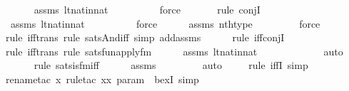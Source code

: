 \begin{isabellebody}
\ \ \ \ \isamarkupfalse%
\ assms\ lt{\isacharunderscore}{\kern0pt}nat{\isacharunderscore}{\kern0pt}in{\isacharunderscore}{\kern0pt}nat\ \isanewline
\ \ \ \ \ \ \ \isamarkupfalse%
\ force\isanewline
\ \ \ \ \ \ \isamarkupfalse%
{\isacharparenleft}{\kern0pt}rule\ conjI{\isacharparenright}{\kern0pt}\isanewline
\ \ \ \ \isamarkupfalse%
\ assms\ lt{\isacharunderscore}{\kern0pt}nat{\isacharunderscore}{\kern0pt}in{\isacharunderscore}{\kern0pt}nat\ \isanewline
\ \ \ \ \ \ \ \isamarkupfalse%
\ force\isanewline
\ \ \ \ \isamarkupfalse%
\ assms\ nth{\isacharunderscore}{\kern0pt}type\ \isanewline
\ \ \ \ \ \ \isamarkupfalse%
\ force\isanewline
\ \ \ \ \ \isamarkupfalse%
{\isacharparenleft}{\kern0pt}rule\ iff{\isacharunderscore}{\kern0pt}trans{\isacharcomma}{\kern0pt}\ rule\ sats{\isacharunderscore}{\kern0pt}And{\isacharunderscore}{\kern0pt}iff{\isacharcomma}{\kern0pt}\ simp\ add{\isacharcolon}{\kern0pt}assms{\isacharparenright}{\kern0pt}\isanewline
\ \ \ \ \ \isamarkupfalse%
{\isacharparenleft}{\kern0pt}rule\ iff{\isacharunderscore}{\kern0pt}conjI{\isacharparenright}{\kern0pt}\isanewline
\ \ \ \ \ \ \isamarkupfalse%
{\isacharparenleft}{\kern0pt}rule\ iff{\isacharunderscore}{\kern0pt}trans{\isacharcomma}{\kern0pt}\ rule\ sats{\isacharunderscore}{\kern0pt}fun{\isacharunderscore}{\kern0pt}apply{\isacharunderscore}{\kern0pt}fm{\isacharparenright}{\kern0pt}\isanewline
\ \ \ \ \isamarkupfalse%
\ assms\ lt{\isacharunderscore}{\kern0pt}nat{\isacharunderscore}{\kern0pt}in{\isacharunderscore}{\kern0pt}nat\ \isanewline
\ \ \ \ \ \ \ \ \ \ \isamarkupfalse%
\ auto{\isacharbrackleft}{\kern0pt}{}{\isacharbrackright}{\kern0pt}\isanewline
\ \ \ \ \ \isamarkupfalse%
{\isacharparenleft}{\kern0pt}rule\ sats{\isacharunderscore}{\kern0pt}is{\isacharunderscore}{\kern0pt}{}{\isacharunderscore}{\kern0pt}fm{\isacharunderscore}{\kern0pt}iff{\isacharparenright}{\kern0pt}\isanewline
\ \ \ \ \isamarkupfalse%
\ assms\isanewline
\ \ \ \ \ \ \ \isamarkupfalse%
\ auto{\isacharbrackleft}{\kern0pt}{}{\isacharbrackright}{\kern0pt}\isanewline
\ \ \ \ \isamarkupfalse%
{\isacharparenleft}{\kern0pt}rule\ iffI{\isacharcomma}{\kern0pt}\ simp{\isacharparenright}{\kern0pt}\isanewline
\ \ \ \ \isamarkupfalse%
{\isacharparenleft}{\kern0pt}rename{\isacharunderscore}{\kern0pt}tac\ x{\isacharcomma}{\kern0pt}\ rule{\isacharunderscore}{\kern0pt}tac\ x{\isacharequal}{\kern0pt}{\isachardoublequoteopen}{\isacharless}{\kern0pt}x{\isacharcomma}{\kern0pt}\ param{\isachargreater}{\kern0pt}{\isachardoublequoteclose}\ \ bexI{\isacharcomma}{\kern0pt}\ simp{\isacharparenright}{\kern0pt}\isanewline

\end{isabellebody}
